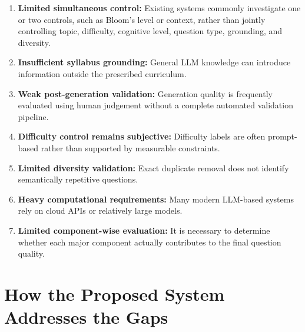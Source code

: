 \documentclass[12pt,a4paper]{report}
\begin{document}
\begin{enumerate}

\item \textbf{Limited simultaneous control:}
Existing systems commonly investigate one or two controls, such as Bloom's level or context, rather than jointly controlling topic, difficulty, cognitive level, question type, grounding, and diversity.

\item \textbf{Insufficient syllabus grounding:}
General LLM knowledge can introduce information outside the prescribed curriculum.

\item \textbf{Weak post-generation validation:}
Generation quality is frequently evaluated using human judgement without a complete automated validation pipeline.

\item \textbf{Difficulty control remains subjective:}
Difficulty labels are often prompt-based rather than supported by measurable constraints.

\item \textbf{Limited diversity validation:}
Exact duplicate removal does not identify semantically repetitive questions.

\item \textbf{Heavy computational requirements:}
Many modern LLM-based systems rely on cloud APIs or relatively large models.

\item \textbf{Limited component-wise evaluation:}
It is necessary to determine whether each major component actually contributes to the final question quality.

\end{enumerate}

\section{How the Proposed System Addresses the Gaps}
\end{document}
